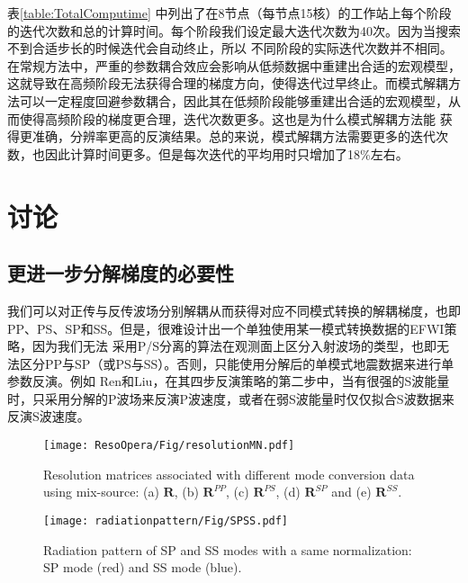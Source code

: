 表\ref{table:TotalComputime}
中列出了在8节点（每节点15核）的工作站上每个阶段的迭代次数和总的计算时间。每个阶段我们设定最大迭代次数为40次。因为当搜索不到合适步长的时候迭代会自动终止，所以
不同阶段的实际迭代次数并不相同。在常规方法中，严重的参数耦合效应会影响从低频数据中重建出合适的宏观模型，这就导致在高频阶段无法获得合理的梯度方向，使得迭代过早终止。而模式解耦方法可以一定程度回避参数耦合，因此其在低频阶段能够重建出合适的宏观模型，从而使得高频阶段的梯度更合理，迭代次数更多。这也是为什么模式解耦方法能
获得更准确，分辨率更高的反演结果。总的来说，模式解耦方法需要更多的迭代次数，也因此计算时间更多。但是每次迭代的平均用时只增加了18\%左右。
\section{讨论}
\subsection{更进一步分解梯度的必要性}
我们可以对正传与反传波场分别解耦从而获得对应不同模式转换的解耦梯度，也即PP、PS、SP和SS。但是，很难设计出一个单独使用某一模式转换数据的EFWI策略，因为我们无法
采用P/S分离的算法在观测面上区分入射波场的类型，也即无法区分PP与SP（或PS与SS）。否则，只能使用分解后的单模式地震数据来进行单参数反演。例如
Ren和Liu\cite{ren.liu:2016}，在其四步反演策略的第二步中，当有很强的S波能量时，只采用分解的P波场来反演P波速度，或者在弱S波能量时仅仅拟合S波数据来反演S波速度。
\begin{figure*}
    \begin{center}
        \texttt{[image: ResoOpera/Fig/resolutionMN.pdf]}
        \caption{
            Resolution matrices associated with different mode conversion data using
            mix-source:
            (a) $\mathbf{R}$, (b) $\mathbf{R}^{PP}$, (c) $\mathbf{R}^{PS}$, (d)
            $\mathbf{R}^{SP}$ and (e)
            $\mathbf{R}^{SS}$.
    }
    \label{fig:ResoMN}
    \end{center}
\end{figure*}

\begin{figure*}
    \begin{center}
        \texttt{[image: radiationpattern/Fig/SPSS.pdf]}
        \caption{
            Radiation pattern of SP and SS modes with a same normalization: SP
            mode (red) and SS mode (blue).
    }
    \label{fig:SPSS}
    \end{center}
\end{figure*}


